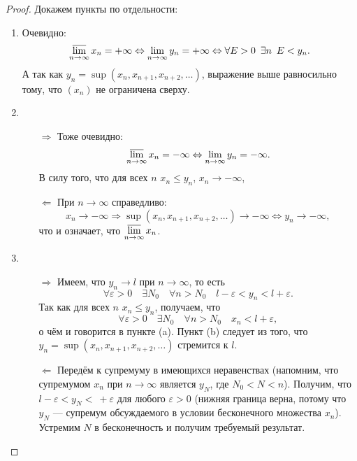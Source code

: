 \begin{proof}
	Докажем пункты по отдельности:
	\begin{enumerate}
		\item Очевидно: \[
			\varlimsup_{n \to \infty} x_n = +\infty \Leftrightarrow \lim_{n \to \infty} y_n = +\infty \Leftrightarrow \forall E > 0 \enskip \exists n \enskip E < y_n.
		\]
		А так как \(y_n = \sup(x_n, x_{n + 1}, x_{n + 2}, \ldots)\), выражение выше равносильно тому, что \((x_n)\) не ограничена сверху.
		\item 
		\begin{enumerate}
			\item[\(\Rightarrow\)] Тоже очевидно: \[
			\varlimsup\limits_{n \to \infty} x_n = -\infty \Leftrightarrow \lim_{n \to \infty} y_n = -\infty.
			\]
			В силу того, что для всех \(n\) \(x_n \leqslant y_n\), \(x_n \to -\infty\),
			\item[\(\Leftarrow\)] При \(n \to \infty\) справедливо: \[
				x_n \to -\infty \Rightarrow \sup(x_n, x_{n + 1}, x_{n + 2}, \ldots) \to -\infty \Leftrightarrow y_n \to -\infty,
			\]
			что и означает, что \(\varlimsup\limits_{n \to \infty} x_n\).
		\end{enumerate}
		\item
		\begin{enumerate}
			\item[\(\Rightarrow\)] Имеем, что \(y_n \to l\) при \(n \to \infty\), то есть \[
				\forall \varepsilon > 0 \quad  \exists N_0 \quad \forall n > N_0 \quad l - \varepsilon < y_n < l + \varepsilon.
			\]
			Так как для всех \(n\) \(x_n \leqslant y_n\), получаем, что \[
				\forall \varepsilon > 0 \quad  \exists N_0 \quad \forall n > N_0 \quad x_n < l + \varepsilon,
			\]
			о чём и говорится в пункте (a). Пункт (b) следует из того, что \(y_n = \sup(x_n, x_{n + 1}, x_{n + 2}, \ldots)\) стремится к \(l\).
			\item[\(\Leftarrow\)] Передём к супремуму в имеющихся неравенствах (напомним, что супремумом \(x_n\) при \(n \to \infty\) является \(y_N\), где \(N_0 < N < n\)). Получим, что \(l - \varepsilon < y_N < \ + \varepsilon\) для любого \(\varepsilon > 0\) (нижняя граница верна, потому что \(y_N\) --- супремум обсуждаемого в условии бесконечного множества \(x_n\)). Устремим \(N\) в бесконечность и получим требуемый результат.
		\end{enumerate}
	\end{enumerate}
\end{proof}